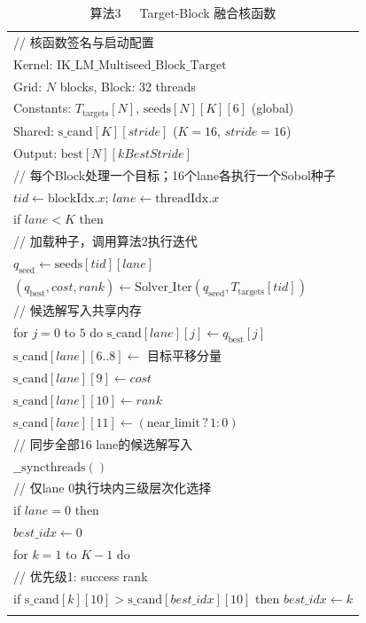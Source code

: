\documentclass[twocolumn,a4paper,10pt]{ctexart}
\makeatletter
\newenvironment{algotable}[2]{%
  \begin{table}[htbp]
  \centering
  \caption{#2}
  \label{#1}
  \footnotesize\ttfamily
  \begin{tabular}{@{}p{\columnwidth}@{}}
  \toprule
}{%
  \\\bottomrule
  \end{tabular}
  \end{table}
}
\makeatother
\begin{document}
\begin{algotable}{alg:kernel}{算法3~~~Target-Block 融合核函数}
// 核函数签名与启动配置\\
Kernel: $\mathrm{IK\_LM\_Multiseed\_Block\_Target}$\\
Grid: $N$ blocks, Block: 32 threads\\
Constants: $T_{\mathrm{targets}}[N]$, $\mathrm{seeds}[N][K][6]$ (global)\\
Shared: $\mathrm{s\_cand}[K][\textit{stride}]$ ($K{=}16$, $\textit{stride}{=}16$)\\
Output: $\mathrm{best}[N][\textit{kBestStride}]$\\[2pt]
// 每个Block处理一个目标；16个lane各执行一个Sobol种子\\
\quad $\textit{tid}\leftarrow\mathrm{blockIdx}.x$; $\textit{lane}\leftarrow\mathrm{threadIdx}.x$\\
\quad if $\textit{lane}<K$ then\\
// 加载种子，调用算法2执行迭代\\
\qquad $q_{\mathrm{seed}}\leftarrow\mathrm{seeds}[\textit{tid}][\textit{lane}]$\\
\qquad $(q_{\mathrm{best}},\textit{cost},\textit{rank})\leftarrow\mathrm{Solver\_Iter}(q_{\mathrm{seed}},T_{\mathrm{targets}}[\textit{tid}])$\\
// 候选解写入共享内存\\
\qquad for $j=0$ to $5$ do $\mathrm{s\_cand}[\textit{lane}][j]\leftarrow q_{\mathrm{best}}[j]$\\
\qquad $\mathrm{s\_cand}[\textit{lane}][6..8]\leftarrow$ 目标平移分量\\
\qquad $\mathrm{s\_cand}[\textit{lane}][9]\leftarrow\textit{cost}$\\
\qquad $\mathrm{s\_cand}[\textit{lane}][10]\leftarrow\textit{rank}$\\
\qquad $\mathrm{s\_cand}[\textit{lane}][11]\leftarrow(\mathrm{near\_limit}\,?\,1:0)$\\
// 同步全部16 lane的候选解写入\\
\quad $\_\_\mathrm{syncthreads}()$\\
// 仅lane 0执行块内三级层次化选择\\
\quad if $\textit{lane}=0$ then\\
\qquad $\textit{best\_idx}\leftarrow0$\\
\qquad for $k=1$ to $K-1$ do\\
// 优先级1: success rank\\
\qquad\quad if $\mathrm{s\_cand}[k][10]>\mathrm{s\_cand}[\textit{best\_idx}][10]$ then $\textit{best\_idx}\leftarrow k$\\

\end{algotable}
\end{document}
